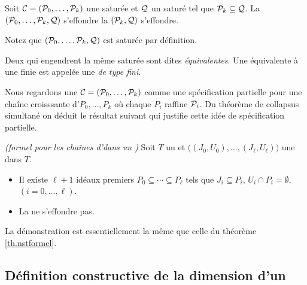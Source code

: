 \begin{corollary} \label{corthColSimT2}
Soit ${\cal C}=({\cal P}_0,\dots,{\cal P}_k)$ une \proc saturée et ${\cal Q}$ un \proi saturé tel
que ${\cal P}_k\subseteq {\cal Q}$. La \proc $({\cal P}_0,\dots,{\cal P}_k,{\cal Q})$ s'effondre \ssi
la \proc $({\cal P}_k,{\cal Q})$ s'effondre.  
\end{corollary}
Notez que  $({\cal P}_0,\dots,{\cal P}_k,{\cal Q})$ est saturée par définition.

\begin{definition}{\rm 
\label{defproch3T} 
 Deux \procs qui engendrent la même \proc saturée sont dites
{\em
équivalentes}.
 Une \proc équivalente à une \proc finie est appelée une {\em
\proc de type fini}.
}
\end{definition}

Nous regardons une \proc ${\cal C}=({\cal P}_0,\dots,{\cal P}_k)$  comme une spécification partielle
pour une chaîne croisssante d'\ideps $P_0,\ldots,P_k$ où chaque $P_i$
raffine ${\cal P}_i$.
Du théorème de collapsus simultané on déduit le résultat
suivant qui justifie cette idée de spécification partielle.
\begin{theorem}
\label{th.nstformelTreil} {\em (\nst formel pour les chaînes
d'\ideps dans un \trdi)} \Tcgi Soit $T$ un \trdi et
$\big((J_0,U_0),\ldots,(J_\ell,U_\ell)\big)$ une \proc dans $T$. \Propeq
\begin{itemize}
\item [$(a)$] Il existe $\ell+1$ idéaux premiers $P_0\subseteq
\cdots\subseteq
P_\ell$  tels que
 $J_i\subseteq P_i$, $U_i\cap P_i=\emptyset $, $(i=0,\ldots,\ell)$.
\item [$(b)$] La \proc ne s'effondre pas.
\end{itemize}
\end{theorem}
La démonstration est essentiellement la même que celle du théorème \ref{th.nstformel}. 


\subsection{Définition constructive de la dimension d'un \trdi}
\label{subsubsecDimTrdi}

